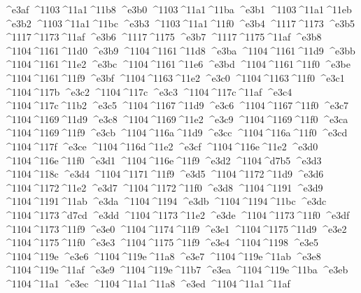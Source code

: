 \checkit ^^^^e3af ^^^^1103^^^^11a1^^^^11b8
\checkit ^^^^e3b0 ^^^^1103^^^^11a1^^^^11ba
\checkit ^^^^e3b1 ^^^^1103^^^^11a1^^^^11eb
\checkit ^^^^e3b2 ^^^^1103^^^^11a1^^^^11bc
\checkit ^^^^e3b3 ^^^^1103^^^^11a1^^^^11f0
\checkit ^^^^e3b4 ^^^^1117^^^^1173
\checkit ^^^^e3b5 ^^^^1117^^^^1173^^^^11af
\checkit ^^^^e3b6 ^^^^1117^^^^1175
\checkit ^^^^e3b7 ^^^^1117^^^^1175^^^^11af
\checkit ^^^^e3b8 ^^^^1104^^^^1161^^^^11d0
\checkit ^^^^e3b9 ^^^^1104^^^^1161^^^^11d8
\checkit ^^^^e3ba ^^^^1104^^^^1161^^^^11d9
\checkit ^^^^e3bb ^^^^1104^^^^1161^^^^11e2
\checkit ^^^^e3bc ^^^^1104^^^^1161^^^^11e6
\checkit ^^^^e3bd ^^^^1104^^^^1161^^^^11f0
\checkit ^^^^e3be ^^^^1104^^^^1161^^^^11f9
\checkit ^^^^e3bf ^^^^1104^^^^1163^^^^11e2
\checkit ^^^^e3c0 ^^^^1104^^^^1163^^^^11f0
\checkit ^^^^e3c1 ^^^^1104^^^^117b
\checkit ^^^^e3c2 ^^^^1104^^^^117c
\checkit ^^^^e3c3 ^^^^1104^^^^117c^^^^11af
\checkit ^^^^e3c4 ^^^^1104^^^^117c^^^^11b2
\checkit ^^^^e3c5 ^^^^1104^^^^1167^^^^11d9
\checkit ^^^^e3c6 ^^^^1104^^^^1167^^^^11f0
\checkit ^^^^e3c7 ^^^^1104^^^^1169^^^^11d9
\checkit ^^^^e3c8 ^^^^1104^^^^1169^^^^11e2
\checkit ^^^^e3c9 ^^^^1104^^^^1169^^^^11f0
\checkit ^^^^e3ca ^^^^1104^^^^1169^^^^11f9
\checkit ^^^^e3cb ^^^^1104^^^^116a^^^^11d9
\checkit ^^^^e3cc ^^^^1104^^^^116a^^^^11f0
\checkit ^^^^e3cd ^^^^1104^^^^117f
\checkit ^^^^e3ce ^^^^1104^^^^116d^^^^11e2
\checkit ^^^^e3cf ^^^^1104^^^^116e^^^^11e2
\checkit ^^^^e3d0 ^^^^1104^^^^116e^^^^11f0
\checkit ^^^^e3d1 ^^^^1104^^^^116e^^^^11f9
\checkit ^^^^e3d2 ^^^^1104^^^^d7b5
\checkit ^^^^e3d3 ^^^^1104^^^^118c
\checkit ^^^^e3d4 ^^^^1104^^^^1171^^^^11f9
\checkit ^^^^e3d5 ^^^^1104^^^^1172^^^^11d9
\checkit ^^^^e3d6 ^^^^1104^^^^1172^^^^11e2
\checkit ^^^^e3d7 ^^^^1104^^^^1172^^^^11f0
\checkit ^^^^e3d8 ^^^^1104^^^^1191
\checkit ^^^^e3d9 ^^^^1104^^^^1191^^^^11ab
\checkit ^^^^e3da ^^^^1104^^^^1194
\checkit ^^^^e3db ^^^^1104^^^^1194^^^^11bc
\checkit ^^^^e3dc ^^^^1104^^^^1173^^^^d7cd
\checkit ^^^^e3dd ^^^^1104^^^^1173^^^^11e2
\checkit ^^^^e3de ^^^^1104^^^^1173^^^^11f0
\checkit ^^^^e3df ^^^^1104^^^^1173^^^^11f9
\checkit ^^^^e3e0 ^^^^1104^^^^1174^^^^11f9
\checkit ^^^^e3e1 ^^^^1104^^^^1175^^^^11d9
\checkit ^^^^e3e2 ^^^^1104^^^^1175^^^^11f0
\checkit ^^^^e3e3 ^^^^1104^^^^1175^^^^11f9
\checkit ^^^^e3e4 ^^^^1104^^^^1198
\checkit ^^^^e3e5 ^^^^1104^^^^119e
\checkit ^^^^e3e6 ^^^^1104^^^^119e^^^^11a8
\checkit ^^^^e3e7 ^^^^1104^^^^119e^^^^11ab
\checkit ^^^^e3e8 ^^^^1104^^^^119e^^^^11af
\checkit ^^^^e3e9 ^^^^1104^^^^119e^^^^11b7
\checkit ^^^^e3ea ^^^^1104^^^^119e^^^^11ba
\checkit ^^^^e3eb ^^^^1104^^^^11a1
\checkit ^^^^e3ec ^^^^1104^^^^11a1^^^^11a8
\checkit ^^^^e3ed ^^^^1104^^^^11a1^^^^11af
